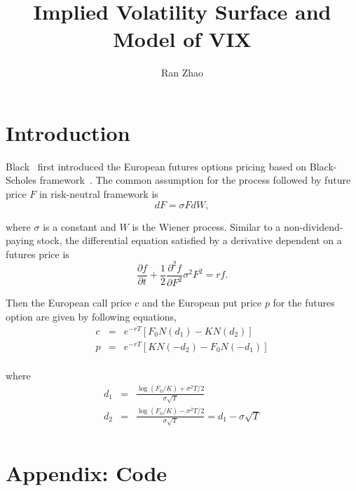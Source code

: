 \documentclass[11pt,reqno,final]{amsart}
\title{Implied Volatility Surface and Model of VIX}
\author{Ran Zhao}
\begin{document}
\begin{abstract}

\end{abstract}

\maketitle
%
%
%
\section{Introduction}
Black~\cite{Black76} first introduced the European futures options pricing based on Black-Scholes framework~\cite{BS73}. The common assumption for the process followed by future price $F$ in risk-neutral framework is
\begin{equation}
dF=\sigma F dW,
\end{equation}

where $\sigma$ is a constant and $W$ is the Wiener process. Similar to a non-dividend-paying stock, the differential equation satisfied by a derivative dependent on a futures price is
$$
\frac{\partial f}{\partial t} + \frac{1}{2} \frac{\partial^2 f}{\partial F^2} \sigma^2 F^2 = rf.
$$

Then the European call price $c$ and the European put price $p$ for the futures option are given by following equations,
\begin{eqnarray*}
c &=& e^{-rT}[F_0 N(d_1) - KN(d_2)] \\
p &=& e^{-rT}[K N(-d_2) - F_0 N(-d_1)] \\
\end{eqnarray*}

where
\begin{eqnarray*}
d_1 &=& \frac{\log(F_0/K) + \sigma^2T/2}{\sigma\sqrt{T}} \\
d_2 &=& \frac{\log(F_0/K) - \sigma^2T/2}{\sigma\sqrt{T}} = d_1 -\sigma\sqrt{T} \\
\end{eqnarray*}

%
%
\newpage


%
%
\newpage
\section*{Appendix: Code}
%
\end{document}
